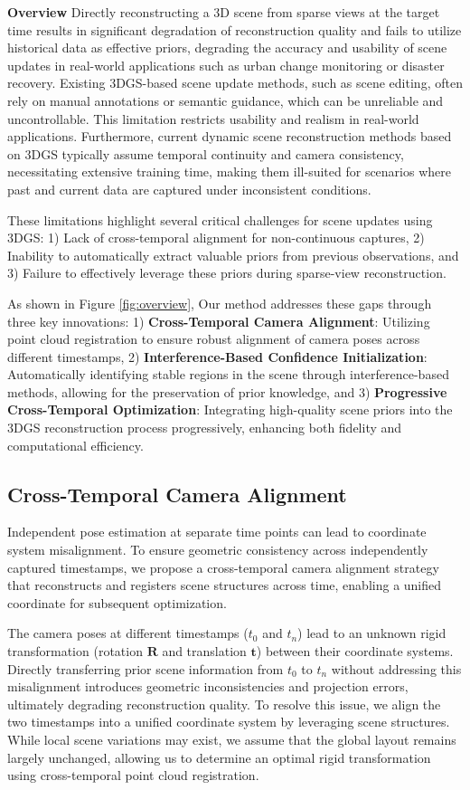 \documentclass[letterpaper]{article} %
\begin{document}
\textbf{Overview}
Directly reconstructing a 3D scene from sparse views at the target time results in significant degradation of reconstruction quality and fails to utilize historical data as effective priors, degrading the accuracy and usability of scene updates in real-world applications such as urban change monitoring or disaster recovery. Existing 3DGS-based scene update methods, such as scene editing, often rely on manual annotations or semantic guidance, which can be unreliable and uncontrollable. This limitation restricts usability and realism in real-world applications. Furthermore, current dynamic scene reconstruction methods based on 3DGS typically assume temporal continuity and camera consistency, necessitating extensive training time, making them ill-suited for scenarios where past and current data are captured under inconsistent conditions.

These limitations highlight several critical challenges for scene updates using 3DGS:
1) Lack of cross-temporal alignment for non-continuous captures, 
2) Inability to automatically extract valuable priors from previous observations, and
3) Failure to effectively leverage these priors during sparse-view reconstruction.

As shown in Figure \ref{fig:overview}, Our method addresses these gaps through three key innovations:
1) \textbf{Cross-Temporal Camera Alignment}: Utilizing point cloud registration to ensure robust alignment of camera poses across different timestamps, 
2) \textbf{Interference-Based Confidence Initialization}: Automatically identifying stable regions in the scene through interference-based methods, allowing for the preservation of prior knowledge, and
3) \textbf{Progressive Cross-Temporal Optimization}: Integrating high-quality scene priors into the 3DGS reconstruction process progressively, enhancing both fidelity and computational efficiency.

\subsection{Cross-Temporal Camera Alignment}
Independent pose estimation at separate time points can lead to coordinate system misalignment. 
To ensure geometric consistency across independently captured timestamps, we propose a cross-temporal camera alignment strategy that reconstructs and registers scene structures across time, enabling a unified coordinate for subsequent optimization.

The camera poses at different timestamps ($t_0$ and $t_n$) lead to an unknown rigid transformation (rotation $\mathbf{R}$ and translation $\mathbf{t}$) between their coordinate systems. Directly transferring prior scene information from $t_0$ to $t_n$ without addressing this misalignment introduces geometric inconsistencies and projection errors, ultimately degrading reconstruction quality. 
To resolve this issue, we align the two timestamps into a unified coordinate system by leveraging scene structures. While local scene variations may exist, we assume that the global layout remains largely unchanged, allowing us to determine an optimal rigid transformation using cross-temporal point cloud registration.
\end{document}
